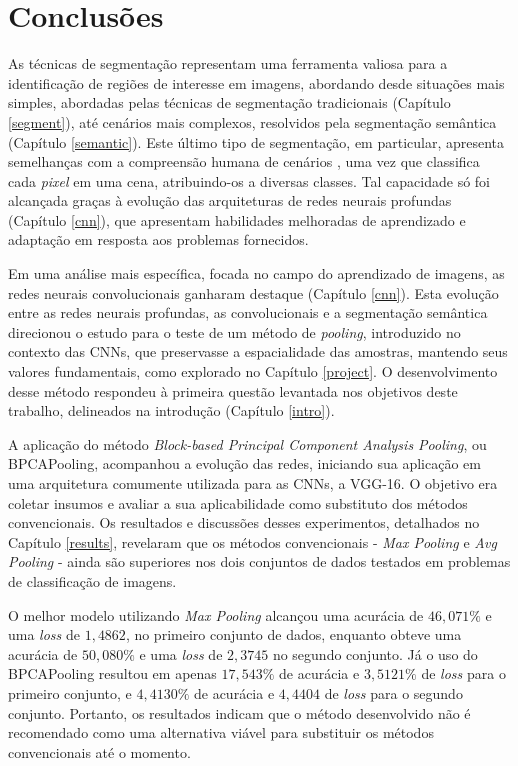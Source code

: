 \newpage
\clearpage
\section{Conclusões}
\label{conclusion}
As técnicas de segmentação representam uma ferramenta valiosa para a identificação de regiões de interesse em imagens, abordando desde situações mais simples, abordadas pelas técnicas de segmentação tradicionais (Capítulo \ref{segment}), até cenários mais complexos, resolvidos pela segmentação semântica (Capítulo \ref{semantic}). Este último tipo de segmentação, em particular, apresenta semelhanças com a compreensão humana de cenários \citep{Mohan2020}, uma vez que classifica cada \textit{pixel} em uma cena, atribuindo-os a diversas classes. Tal capacidade só foi alcançada graças à evolução das arquiteturas de redes neurais profundas (Capítulo \ref{cnn}), que apresentam habilidades melhoradas de aprendizado e adaptação em resposta aos problemas fornecidos.

Em uma análise mais específica, focada no campo do aprendizado de imagens, as redes neurais convolucionais ganharam destaque (Capítulo \ref{cnn}). Esta evolução entre as redes neurais profundas, as convolucionais e a segmentação semântica direcionou o estudo para o teste de um método de \textit{pooling}, introduzido no contexto das CNNs, que preservasse a espacialidade das amostras, mantendo seus valores fundamentais, como explorado no Capítulo \ref{project}. O desenvolvimento desse método respondeu à primeira questão levantada nos objetivos deste trabalho, delineados na introdução (Capítulo \ref{intro}).

A aplicação do método \textit{Block-based Principal Component Analysis Pooling}, ou BPCAPooling, acompanhou a evolução das redes, iniciando sua aplicação em uma arquitetura comumente utilizada para as CNNs, a VGG-16. O objetivo era coletar insumos e avaliar a sua aplicabilidade como substituto dos métodos convencionais. Os resultados e discussões desses experimentos, detalhados no Capítulo \ref{results}, revelaram que os métodos convencionais - \textit{Max Pooling} e \textit{Avg Pooling} - ainda são superiores nos dois conjuntos de dados testados em problemas de classificação de imagens.

O melhor modelo utilizando \textit{Max Pooling} alcançou uma acurácia de $46,071\%$ e uma \textit{loss} de $1,4862$, no primeiro conjunto de dados, enquanto obteve uma acurácia de $50,080\%$ e uma \textit{loss} de $2,3745$ no segundo conjunto. Já o uso do BPCAPooling resultou em apenas $17,543\%$ de acurácia e $3,5121\%$ de \textit{loss} para o primeiro conjunto, e $4,4130\%$ de acurácia e $4,4404$ de \textit{loss} para o segundo conjunto. Portanto, os resultados indicam que o método desenvolvido não é recomendado como uma alternativa viável para substituir os métodos convencionais até o momento.

